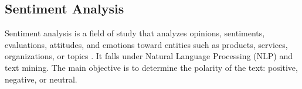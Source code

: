 \subsection{Sentiment Analysis}

Sentiment analysis is a field of study that analyzes opinions, sentiments, evaluations, attitudes, and emotions toward entities such as products, services, organizations, or topics \cite{feldman2013}. It falls under Natural Language Processing (NLP) and text mining. The main objective is to determine the polarity of the text: positive, negative, or neutral.
